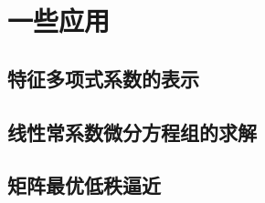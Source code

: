 \section{一些应用}
\label{sec:一些应用}


\subsection{特征多项式系数的表示}
\label{sub:特征多项式系数的表示}

\subsection{线性常系数微分方程组的求解}
\label{sub:线性常系数微分方程组的求解}

\subsection{矩阵最优低秩逼近}
\label{sub:矩阵最优低秩逼近}


